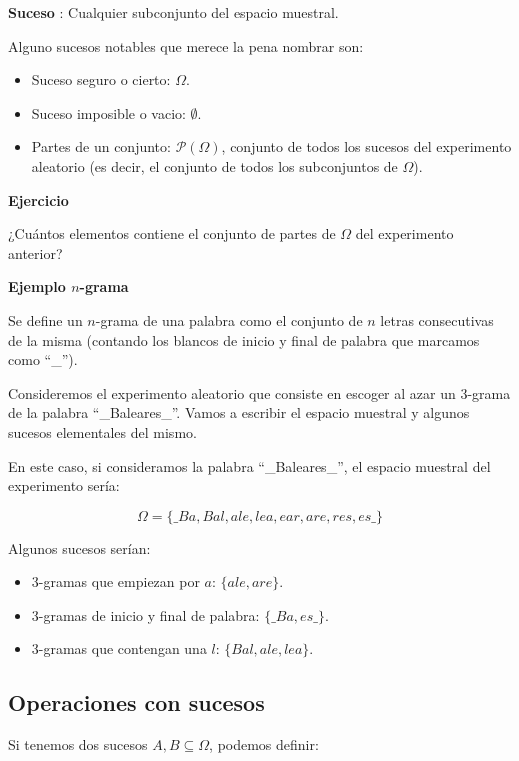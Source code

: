 \documentclass[
  letterpaper,
  DIV=11,
  numbers=noendperiod]{scrreprt}
\providecommand{\tightlist}{%
  \setlength{\itemsep}{0pt}\setlength{\parskip}{0pt}}\usepackage{longtable,booktabs,array}
\begin{document}
\textbf{Suceso} : Cualquier subconjunto del espacio muestral.

Alguno sucesos notables que merece la pena nombrar son:

\begin{itemize}
\tightlist
\item
  Suceso seguro o cierto: \(\Omega\).
\item
  Suceso imposible o vacio: \(\emptyset\).
\item
  Partes de un conjunto: \(\mathcal{P}(\Omega)\), conjunto de todos los
  sucesos del experimento aleatorio (es decir, el conjunto de todos los
  subconjuntos de \(\Omega\)).
\end{itemize}

\textbf{Ejercicio}

¿Cuántos elementos contiene el conjunto de partes de \(\Omega\) del
experimento anterior?

\textbf{Ejemplo \(n\)-grama}

Se define un \(n\)-grama de una palabra como el conjunto de \(n\) letras
consecutivas de la misma (contando los blancos de inicio y final de
palabra que marcamos como ``\_'').

Consideremos el experimento aleatorio que consiste en escoger al azar un
3-grama de la palabra ``\_Baleares\_''. Vamos a escribir el espacio
muestral y algunos sucesos elementales del mismo.

En este caso, si consideramos la palabra ``\_Baleares\_'', el espacio
muestral del experimento sería:

\[\Omega=\{\_Ba, Bal, ale, lea, ear, are, res, es\_\}\]

Algunos sucesos serían:

\begin{itemize}
\tightlist
\item
  3-gramas que empiezan por \(a\): \(\{ale,are\}\).
\item
  3-gramas de inicio y final de palabra: \(\{\_Ba,es\_\}\).
\item
  3-gramas que contengan una \(l\): \(\{Bal,ale,lea\}\).
\end{itemize}

\hypertarget{operaciones-con-sucesos}{%
\subsection{Operaciones con sucesos}\label{operaciones-con-sucesos}}

Si tenemos dos sucesos \(A,B\subseteq \Omega\), podemos definir:
\end{document}
